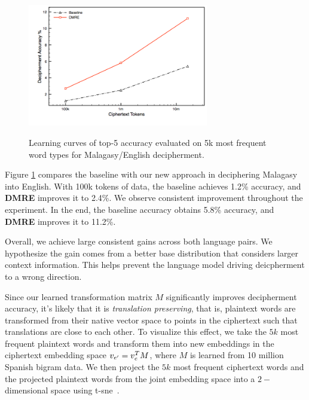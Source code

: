  \begin{figure}[!ht]
  \centering
  \includegraphics[width=3.1in,height=2.4in]{mlg_en_curve}
  \caption{Learning curves of top-5 accuracy evaluated on 5k most frequent word types for Malagasy/English decipherment.}
\label{mlg-en-curve}
\end{figure}

Figure \ref{mlg-en-curve} compares the baseline with our new approach in deciphering Malagasy into English. With 100k tokens of data, the baseline achieves 1.2\% accuracy, and \textbf{DMRE} improves it to 2.4\%.  We observe consistent improvement throughout the experiment. In the end, the baseline accuracy obtains 5.8\% accuracy, and \textbf{DMRE} improves it to 11.2\%.

Overall, we achieve large consistent gains across both language pairs. We hypothesize the gain comes from a better base distribution that considers larger context information. This helps prevent the language model driving deicpherment to a wrong direction. 

Since our learned transformation matrix $M$ significantly improves decipherment accuracy, it's likely that it is \emph{translation preserving}, that is, plaintext words are transformed from their native vector space to points in the ciphertext such that translations are close to each other. To visualize this effect, we take the $5k$ most frequent plaintext words and transform them into new embeddings in the ciphertext embedding space $v_{e'} = v_{e}^T M$, where $M$ is learned from 10 million Spanish bigram data. We then project the $5k$ most frequent ciphertext words and the projected plaintext words from the joint embedding space into a $2-$dimensional space using t-sne~\cite{van2008visualizing}. 

